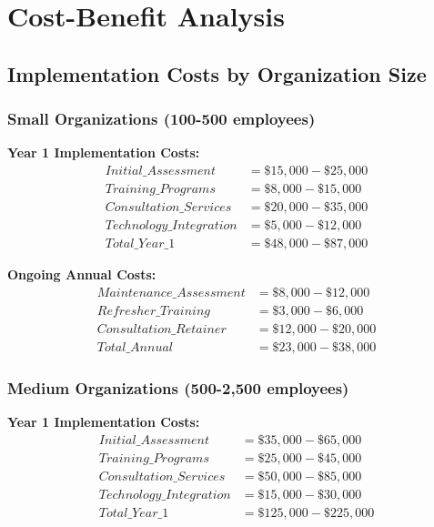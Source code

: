 \documentclass[11pt,a4paper]{article}
\begin{document}
\section{Cost-Benefit Analysis}

\subsection{Implementation Costs by Organization Size}

\subsubsection{Small Organizations (100-500 employees)}

\textbf{Year 1 Implementation Costs:}
\begin{align}
Initial\_Assessment &= \$15,000 - \$25,000 \\
Training\_Programs &= \$8,000 - \$15,000 \\
Consultation\_Services &= \$20,000 - \$35,000 \\
Technology\_Integration &= \$5,000 - \$12,000 \\
Total\_Year\_1 &= \$48,000 - \$87,000
\end{align}

\textbf{Ongoing Annual Costs:}
\begin{align}
Maintenance\_Assessment &= \$8,000 - \$12,000 \\
Refresher\_Training &= \$3,000 - \$6,000 \\
Consultation\_Retainer &= \$12,000 - \$20,000 \\
Total\_Annual &= \$23,000 - \$38,000
\end{align}

\subsubsection{Medium Organizations (500-2,500 employees)}

\textbf{Year 1 Implementation Costs:}
\begin{align}
Initial\_Assessment &= \$35,000 - \$65,000 \\
Training\_Programs &= \$25,000 - \$45,000 \\
Consultation\_Services &= \$50,000 - \$85,000 \\
Technology\_Integration &= \$15,000 - \$30,000 \\
Total\_Year\_1 &= \$125,000 - \$225,000
\end{align}
\end{document}
